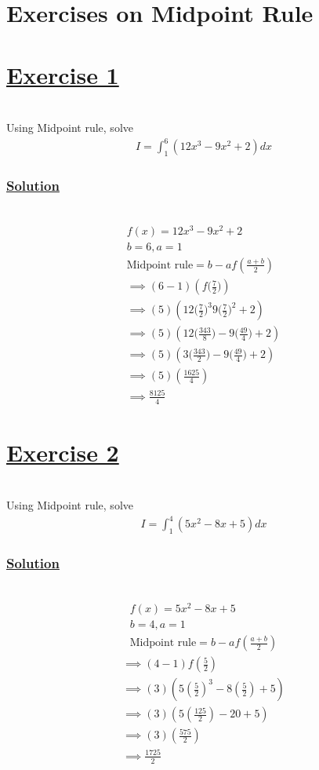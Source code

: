\documentclass[12pt]{report}
\newcommand{\ubt}[1]{\textbf{\underline{#1}}}
\newcommand{\spn}[1]{\\[#1cm]}
\newcommand{\solution}{\subsubsection{\ubt{Solution}}{~}\spn{-2}}
\newcommand{\exercise}[1]{\section*{\ubt{Exercise #1}}{~}\spn{-1}}
\begin{document}
	\section{Exercises on Midpoint Rule}
	\exercise{1}
	Using Midpoint rule, solve
	\begin{eqnarray*}
		I = \int_1^6 (12x^3 - 9x^2 + 2) dx
	\end{eqnarray*}
	\solution
	\begin{gather*}
		f(x) = 12x^3 - 9x^2 + 2\\
		b=6, a=1\\
		\text{Midpoint rule} = b-af\left(\frac{a+b}{2}\right)\\
		\implies (6-1)\left(f\bigg(\frac{7}{2}\bigg)\right)\\
		\implies (5)\left(12\bigg(\frac{7}{2}\bigg)^3 9\bigg(\frac{7}{2}\bigg)^2 + 2\right)\\
		\implies (5)\left(12\bigg(\frac{343}{8}\bigg) - 9\bigg(\frac{49}{4}\bigg) + 2\right)\\
		\implies (5)\left( 3\bigg(\frac{343}{2}\bigg) - 9\bigg(\frac{49}{4}\bigg) + 2\right)\\
		\implies (5) \left(\frac{1625}{4}\right)\\
		\implies \frac{8125}{4}
	\end{gather*}
	
	\exercise{2}
	Using Midpoint rule, solve
	\begin{gather*}
		I=\int_1^4(5x^2-8x+5)dx
	\end{gather*}
	\solution
	\begin{gather*}
		f(x) = 5x^2 - 8x + 5\\
		b=4, a=1\\
		\text{Midpoint rule} = b-af\left(\frac{a+b}{2}\right)
	\end{gather*}
	\begin{gather*}
		\implies (4-1)f\left(\frac{5}{2}\right)\\
		\implies (3) \left( 5\left(\frac{5}{2}\right)^3 - 8\left(\frac{5}{2}\right) + 5\right)\\
		\implies (3)\left(5\left(\frac{125}{2}\right) - 20 + 5 \right)\\
		\implies (3) \left(\frac{575}{2}\right)\\
		\implies \frac{1725}{2}
	\end{gather*}
	
\end{document}
